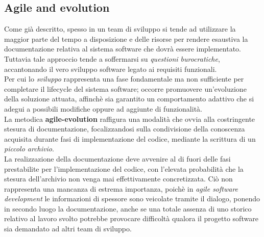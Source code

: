 \documentclass{article}
\begin{document}
\subsection*{Agile and evolution}
\large
Come già descritto, spesso in un team di sviluppo si tende ad utilizzare la maggior parte del tempo a disposizione e delle risorse per rendere esaustiva la documentazione relativa al sistema software che dovrà essere implementato. Tuttavia tale approccio tende a soffermarsi su \textit{questioni burocratiche}, accantonando il vero sviluppo software legato ai requisiti funzionali.\vspace*{14pt}\\
Per cui lo \textit{sviluppo} rappresenta una fase fondamentale ma non sufficiente per completare il lifecycle del sistema software; occorre promuovere un'evoluzione della soluzione attuata, affinchè sia garantito un comportamento adattivo che si adegui a possibili modifiche oppure ad aggiunte di funzionalità.\vspace*{14pt}\\
La metodica \textbf{agile-evolution} raffigura una modalità che ovvia alla costringente stesura di documentazione, focalizzandosi sulla condivisione della conoscenza acquisita durante fasi di implementazione del codice, mediante la scrittura di un \textit{piccolo archivio}.\vspace*{14pt}\\
La realizzazione della documentazione deve avvenire al di fuori delle fasi prestabilite per l'implementazione del codice, con l'elevata probabilità che la stesura dell'archivio non venga mai effettivamente concretizzata. Ciò non rappresenta una mancanza di estrema importanza, poichè in \textit{agile software development} le informazioni di spessore sono veicolate tramite il dialogo, ponendo in secondo luogo la documentazione, anche se una totale assenza di uno storico relativo al lavoro svolto potrebbe provocare difficoltà qualora il progetto software sia demandato ad altri team di sviluppo.
\end{document}
